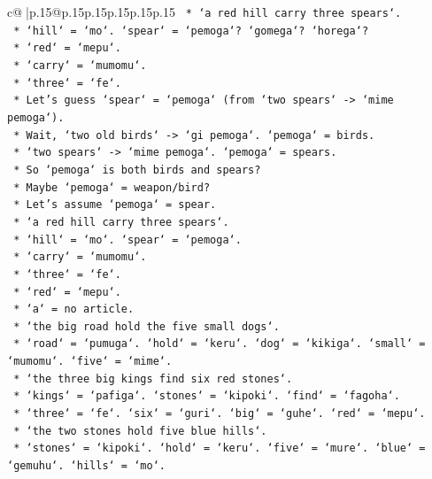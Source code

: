 \documentclass{article}
\begin{document}
{\begin{supertabular}{c@{$\;$}|p{.15\linewidth}@{}p{.15\linewidth}p{.15\linewidth}p{.15\linewidth}p{.15\linewidth}p{.15\linewidth}}
{{{\texttt{            *   `a red hill carry three spears`.} \\
\texttt{            *   `hill` = `mo`. `spear` = `pemoga`? `gomega`? `horega`?} \\
\texttt{            *   `red` = `mepu`.} \\
\texttt{            *   `carry` = `mumomu`.} \\
\texttt{            *   `three` = `fe`.} \\
\texttt{            *   Let's guess `spear` = `pemoga` (from `two spears` {-}> `mime pemoga`).} \\
\texttt{            *   Wait, `two old birds` {-}> `gi pemoga`. `pemoga` = birds.} \\
\texttt{            *   `two spears` {-}> `mime pemoga`. `pemoga` = spears.} \\
\texttt{            *   So `pemoga` is both birds and spears?} \\
\texttt{            *   Maybe `pemoga` = weapon/bird?} \\
\texttt{            *   Let's assume `pemoga` = spear.} \\
\texttt{            *   `a red hill carry three spears`.} \\
\texttt{            *   `hill` = `mo`. `spear` = `pemoga`.} \\
\texttt{            *   `carry` = `mumomu`.} \\
\texttt{            *   `three` = `fe`.} \\
\texttt{            *   `red` = `mepu`.} \\
\texttt{            *   `a` = no article.} \\
\texttt{            *   `the big road hold the five small dogs`.} \\
\texttt{            *   `road` = `pumuga`. `hold` = `keru`. `dog` = `kikiga`. `small` = `mumomu`. `five` = `mime`.} \\
\texttt{            *   `the three big kings find six red stones`.} \\
\texttt{            *   `kings` = `pafiga`. `stones` = `kipoki`. `find` = `fagoha`.} \\
\texttt{            *   `three` = `fe`. `six` = `guri`. `big` = `guhe`. `red` = `mepu`.} \\
\texttt{            *   `the two stones hold five blue hills`.} \\
\texttt{            *   `stones` = `kipoki`. `hold` = `keru`. `five` = `mure`. `blue` = `gemuhu`. `hills` = `mo`.} \\
}}}
\end{supertabular}}
\end{document}
